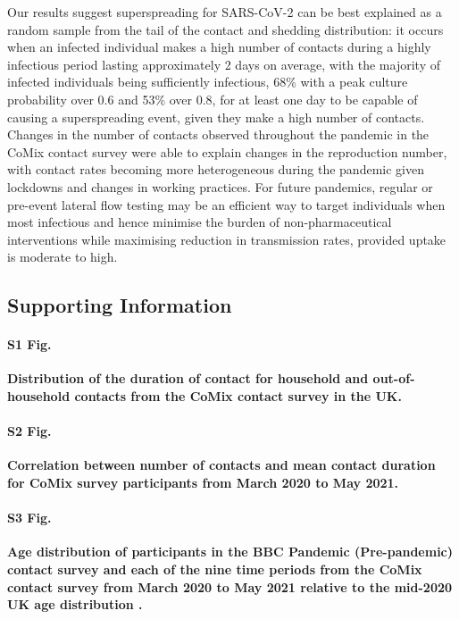 \documentclass[
  10pt,
  letterpaper,
]{article}
\begin{document}
Our results suggest superspreading for SARS-CoV-2 can be best explained
as a random sample from the tail of the contact and shedding
distribution: it occurs when an infected individual makes a high number
of contacts during a highly infectious period lasting approximately 2
days on average, with the majority of infected individuals being
sufficiently infectious, 68\% with a peak culture probability over 0.6
and 53\% over 0.8, for at least one day to be capable of causing a
superspreading event, given they make a high number of contacts. Changes
in the number of contacts observed throughout the pandemic in the CoMix
contact survey were able to explain changes in the reproduction number,
with contact rates becoming more heterogeneous during the pandemic given
lockdowns and changes in working practices. For future pandemics,
regular or pre-event lateral flow testing may be an efficient way to
target individuals when most infectious and hence minimise the burden of
non-pharmaceutical interventions while maximising reduction in
transmission rates, provided uptake is moderate to high.

\subsection{Supporting Information}\label{supporting-information}

\paragraph*{S1 Fig.}
\label{fig-s1}
{\textbf{Distribution of the duration of contact for household and
out-of-household contacts from the CoMix contact survey in the UK.}}

\paragraph*{S2 Fig.}
\label{fig-s2}
{\textbf{Correlation between number of contacts and mean contact
duration for CoMix survey participants from March 2020 to May 2021.}}

\paragraph*{S3 Fig.}
\label{fig-s3}
{\textbf{Age distribution of participants in the BBC Pandemic
(Pre-pandemic) contact survey and each of the nine time periods from the
CoMix contact survey from March 2020 to May 2021 relative to the
mid-2020 UK age distribution \citep{ons2022}.}}
\end{document}
